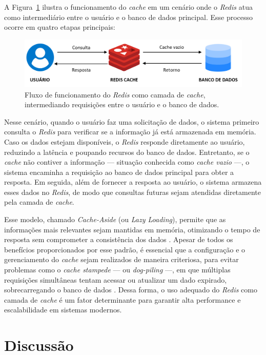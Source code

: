 A Figura~\ref{fig:cache-aside} ilustra o funcionamento do \textit{cache} em um cenário onde o \textit{Redis} atua como intermediário entre o usuário e o banco de dados principal. Esse processo ocorre em quatro etapas principais:

\begin{figure}[H]
\centering
\includegraphics[width=0.8\linewidth]{imagens/redis-work.png}
\caption{Fluxo de funcionamento do \textit{Redis} como camada de \textit{cache}, intermediando requisições entre o usuário e o banco de dados.}
\label{fig:cache-aside}
\end{figure}

Nesse cenário, quando o usuário faz uma solicitação de dados, o sistema primeiro consulta o \textit{Redis} para verificar se a informação já está armazenada em memória. Caso os dados estejam disponíveis, o \textit{Redis} responde diretamente ao usuário, reduzindo a latência e poupando recursos do banco de dados. Entretanto, se o \textit{cache} não contiver a informação — situação conhecida como \textit{cache vazio} —, o sistema encaminha a requisição ao banco de dados principal para obter a resposta. Em seguida, além de fornecer a resposta ao usuário, o sistema armazena esses dados no \textit{Redis}, de modo que consultas futuras sejam atendidas diretamente pela camada de \textit{cache}.

Esse modelo, chamado \textit{Cache-Aside} (ou \textit{Lazy Loading}), permite que as informações mais relevantes sejam mantidas em memória, otimizando o tempo de resposta sem comprometer a consistência dos dados \citep{pamula2014}. Apesar de todos os benefícios proporcionados por esse padrão, é essencial que a configuração e o gerenciamento do \textit{cache} sejam realizados de maneira criteriosa, para evitar problemas como o \textit{cache stampede} — ou \textit{dog-piling} —, em que múltiplas requisições simultâneas tentam acessar ou atualizar um dado expirado, sobrecarregando o banco de dados \citep{falkevych2023, vattani2015}. Dessa forma, o uso adequado do \textit{Redis} como camada de \textit{cache} é um fator determinante para garantir alta performance e escalabilidade em sistemas modernos.

\section{Discussão}

